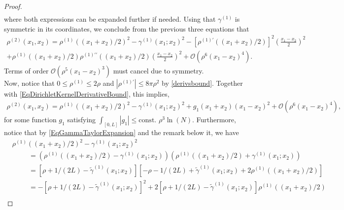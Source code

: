 \documentclass[a4paper,11pt]{article}
\newcommand{\abs}[1]{\left\lvert #1 \right\rvert}
\numberwithin{equation}{section}
\begin{document}
\begin{proof}
\begin{equation}
\begin{aligned}
			\end{aligned}
		\end{equation}
		where both expressions can be expanded further if needed. Using that $ \gamma^{(1)} $ is symmetric in its coordinates, we conclude from the previous three equations that \begin{equation}
			\begin{aligned}
				\rho^{(2)}(x_1,x_2)=\rho^{(1)}((x_1+x_2)/2)^2-\gamma^{(1)}(x_1;x_2)^2-\left[\rho^{(1)\prime}((x_1+x_2)/2)\right]^2\left(\frac{x_1-x_2}{2}\right)^2\\+\rho^{(1)}((x_1+x_2)/2)\rho^{(1)\prime\prime}((x_1+x_2)/2)\left(\frac{x_1-x_2}{2}\right)^2+\mathcal{O}(\rho^6(x_1-x_2)^4).
			\end{aligned}
		\end{equation}
		Terms of order $ \mathcal{O}(\rho^5(x_1-x_2)^3) $ must cancel due to symmetry.\\
		Now, notice that $ 0\leq\rho^{(1)}\leq 2\rho $ and $\abs{\rho^{(1)'}}\leq 8\pi \rho^2 $ by \eqref{derivsbound}. Together with \eqref{EqDirichletKernelDerivativeBound}, this implies,
		\begin{equation}
			\begin{aligned}
				\label{firsteqlem}
				\rho^{(2)}(x_1,x_2)=\rho^{(1)}((x_1+x_2)/2)^2-\gamma^{(1)}(x_1;x_2)^2+g_1(x_1+x_2)(x_1-x_2)^2+\mathcal{O}(\rho^6(x_1-x_2)^4),
			\end{aligned}
		\end{equation}
		for some function $ g_1 $ satisfying $ \int_{[0,L]}\abs{g_1}\leq \text{const. }\rho^3\ln(N)$.
		Furthermore, notice that by \eqref{EqGammaTaylorExpansion} and the remark below it, we have 
		\begin{equation}
			\begin{aligned}
				\label{secondeqlem}
				&\rho^{(1)}((x_1+x_2)/2)^2-\gamma^{(1)}(x_1;x_2)^2\\
				&\hspace{1cm}=(\rho^{(1)}((x_1+x_2)/2)-\gamma^{(1)}(x_1;x_2))(\rho^{(1)}((x_1+x_2)/2)+\gamma^{(1)}(x_1;x_2))\\&\hspace{1cm}
				=\left[\rho+1/(2L)-\tilde{\gamma}^{(1)}(x_1;x_2)\right]\left[-\rho-1/(2L)+\tilde{\gamma}^{(1)}(x_1;x_2)+2\rho^{(1)}((x_1+x_2)/2)\right]\\&\hspace{1cm}
				=-\left[\rho+1/(2L)-\tilde{\gamma}^{(1)}(x_1;x_2)\right]^2+2\left[\rho+1/(2L)-\tilde{\gamma}^{(1)}(x_1;x_2)\right]\rho^{(1)}((x_1+x_2)/2)\\&\hspace{1cm}

\end{aligned}
\end{equation}
\end{proof}
\end{document}
